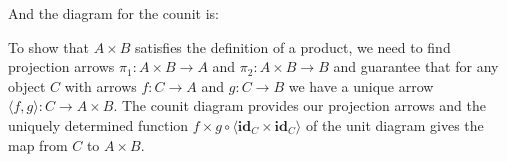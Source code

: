 \documentclass{article}
\newcommand{\id}{\mathbf{id}}
\newcommand{\diagfun}{\mathbf{\Delta}}
\begin{document}
\begin{enumerate}
\begin{center}
  \end{center}

  And the diagram for the counit is:
  \begin{center}
  \end{center}
  To show that $A \times B$ satisfies the definition of a product, we need to find projection arrows $\pi_1 : A \times B \rightarrow A$ and $\pi_2 : A \times B \rightarrow B$ and guarantee that for any object $C$ with arrows $f : C \rightarrow A$ and $g : C \rightarrow B$ we have a unique arrow $\langle f, g \rangle : C \rightarrow A \times B$.
  The counit diagram provides our projection arrows and the uniquely determined function $f \times g \circ \langle \id_C \times \id_C \rangle$ of the unit diagram gives the map from $C$ to $A \times B$.
\end{enumerate}
\end{document}
